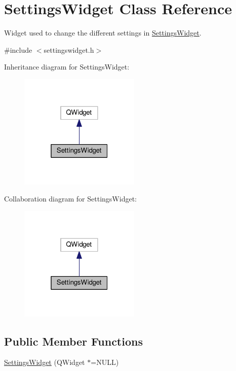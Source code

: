 \hypertarget{classSettingsWidget}{}\section{Settings\+Widget Class Reference}
\label{classSettingsWidget}


Widget used to change the different settings in \hyperlink{classSettingsWidget}{Settings\+Widget}.  




{\ttfamily \#include $<$settingswidget.\+h$>$}



Inheritance diagram for Settings\+Widget\+:\nopagebreak
\begin{figure}[H]
\begin{center}
\leavevmode
\includegraphics[width=163pt]{classSettingsWidget__inherit__graph}
\end{center}
\end{figure}


Collaboration diagram for Settings\+Widget\+:\nopagebreak
\begin{figure}[H]
\begin{center}
\leavevmode
\includegraphics[width=163pt]{classSettingsWidget__coll__graph}
\end{center}
\end{figure}
\subsection*{Public Member Functions}
\begin{DoxyCompactItemize}
\item 
\hyperlink{classSettingsWidget_a339891dcba7d2813bc5d894bff494a78}{Settings\+Widget} (Q\+Widget $\ast$=N\+U\+LL)
\end{DoxyCompactItemize}


